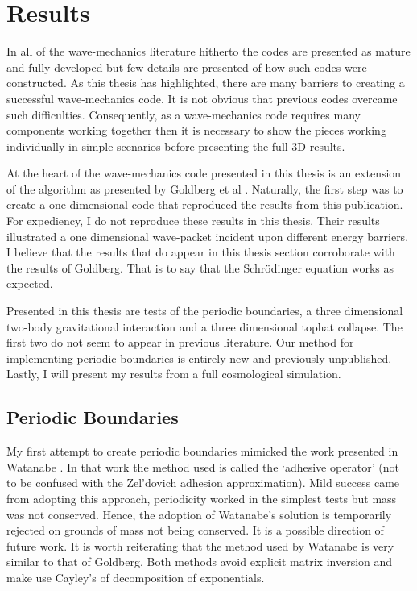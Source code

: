 \section{Results}
\label{ch5_results}
In all of the wave-mechanics literature hitherto the codes are presented as mature and fully developed but few details are presented of how such codes were constructed. As this thesis has highlighted, there are many barriers to creating a successful wave-mechanics code. It is not obvious that previous codes overcame such difficulties. Consequently, as a wave-mechanics code requires many components working together then it is necessary to show the pieces working individually in simple scenarios before presenting the full 3D results.

At the heart of the wave-mechanics code presented in this thesis is an extension of the algorithm as presented by Goldberg et al \citep{bib_gold}. Naturally, the first step was to create a one dimensional code that reproduced the results from this publication. For expediency, I do not reproduce these results in this thesis. Their results illustrated a one dimensional wave-packet incident upon different energy barriers. I believe that the results that do appear in this thesis section corroborate with the results of Goldberg. That is to say that the Schr\"odinger equation works as expected.

Presented in this thesis are tests of the periodic boundaries, a three dimensional two-body gravitational interaction and a three dimensional tophat collapse. The first two do not seem to appear in previous literature. Our method for implementing periodic boundaries is entirely new and previously unpublished. Lastly, I will present my results from a full cosmological simulation.

\subsection{Periodic Boundaries}
\label{per_bou}
My first attempt to create periodic boundaries mimicked the work presented in Watanabe \citep{bib_wat}. In that work the method used is called the `adhesive operator' (not to be confused with the Zel'dovich adhesion approximation). Mild success came from adopting this approach, periodicity worked in the simplest tests but mass was not conserved. Hence, the adoption of Watanabe's solution is temporarily rejected on grounds of mass not being conserved. It is a possible direction of future work. It is worth reiterating that the method used by Watanabe is very similar to that of Goldberg. Both methods avoid explicit matrix inversion and make use Cayley's of decomposition of exponentials.

